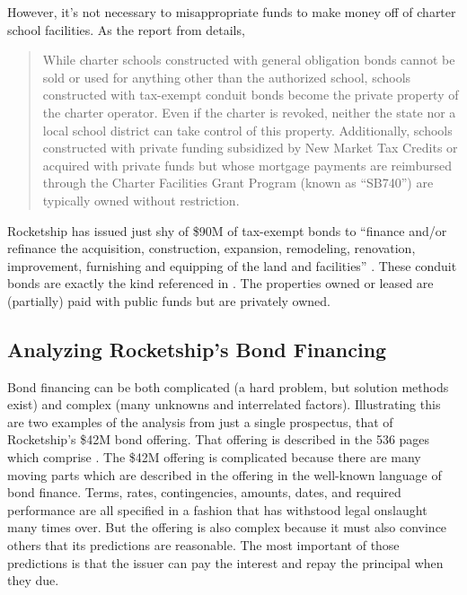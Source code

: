 However, it's not necessary to misappropriate funds to make money off of charter school facilities. As the report  from \citeauthor{ITPT2018} details,

\begin{quotation}\noindent\OnehalfSpacing%
While charter schools constructed with general obligation bonds cannot be sold or used for anything other than the authorized school, schools constructed with tax-exempt conduit bonds become the private property of the charter operator. Even if the charter is revoked, neither the state nor a local school district can take control of this property. Additionally, schools constructed with private funding subsidized by New Market Tax Credits or acquired with private funds but whose mortgage payments are reimbursed through the Charter Facilities Grant Program (known as “SB740”) are typically owned without restriction.\\ 
\end{quotation}

Rocketship has issued just shy of \$90M of tax-exempt bonds to ``finance and/or refinance the acquisition, construction,
expansion, remodeling, renovation, improvement, furnishing and equipping of the land and facilities''  \parencite{CSFA2015,CSFA2015b,CSFA2017,CSFA2017f}. These conduit bonds are exactly the kind referenced in \textcite{ITPT2018}. The properties owned or leased are (partially) paid with public funds but are privately owned.

\subsection{Analyzing Rocketship's Bond Financing}\indent

Bond financing can be both complicated (a hard problem, but solution methods exist) and complex (many unknowns and interrelated factors). Illustrating this are two examples of the analysis from just a single prospectus, that of Rocketship's \$42M bond offering. That offering is described in the 536 pages which comprise . The \$42M offering is complicated because there are many moving parts which are described in the offering in the well-known language of bond finance. Terms, rates, contingencies, amounts, dates, and required performance are all specified in a fashion that has withstood legal onslaught many times over. But the offering is also complex because it must also convince others that its predictions are reasonable. The most important of those predictions is that the issuer can pay the interest and repay the principal when they due.

